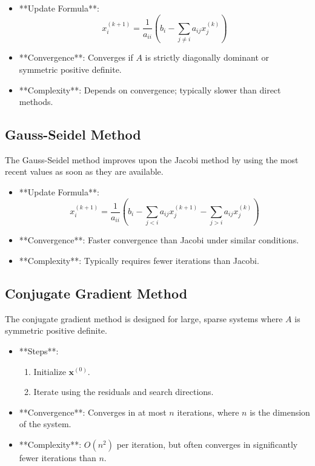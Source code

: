 \documentclass{article}
\begin{document}
\begin{itemize}
    \item **Update Formula**:
    \[
    x_i^{(k+1)} = \frac{1}{a_{ii}} \left( b_i - \sum_{j \neq i} a_{ij} x_j^{(k)} \right)
    \]
    \item **Convergence**: Converges if \( A \) is strictly diagonally dominant or symmetric positive definite.
    \item **Complexity**: Depends on convergence; typically slower than direct methods.
\end{itemize}

\subsection{Gauss-Seidel Method}
The Gauss-Seidel method improves upon the Jacobi method by using the most recent values as soon as they are available.

\begin{itemize}
    \item **Update Formula**:
    \[
    x_i^{(k+1)} = \frac{1}{a_{ii}} \left( b_i - \sum_{j < i} a_{ij} x_j^{(k+1)} - \sum_{j > i} a_{ij} x_j^{(k)} \right)
    \]
    \item **Convergence**: Faster convergence than Jacobi under similar conditions.
    \item **Complexity**: Typically requires fewer iterations than Jacobi.
\end{itemize}

\subsection{Conjugate Gradient Method}
The conjugate gradient method is designed for large, sparse systems where \( A \) is symmetric positive definite.

\begin{itemize}
    \item **Steps**:
    \begin{enumerate}
        \item Initialize \( \mathbf{x}^{(0)} \).
        \item Iterate using the residuals and search directions.
    \end{enumerate}
    \item **Convergence**: Converges in at most \( n \) iterations, where \( n \) is the dimension of the system.
    \item **Complexity**: \( O(n^2) \) per iteration, but often converges in significantly fewer iterations than \( n \).
\end{itemize}
\end{document}
